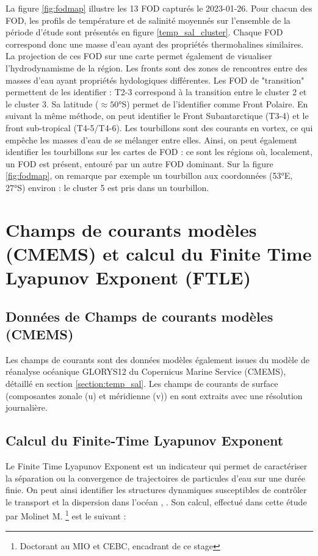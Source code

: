 	 	 La figure \ref{fig:fodmap} illustre les 13 FOD capturés le 2023-01-26. Pour chacun des FOD, les profils de température et de salinité moyennés sur l'ensemble de la période d'étude sont présentés en figure \ref{temp_sal_cluster}. Chaque FOD correspond donc une masse d'eau ayant des propriétés thermohalines similaires. La projection de ces FOD sur une carte permet également de visualiser l'hydrodynamisme de la région. Les fronts sont des zones de rencontres entre des masses d'eau ayant propriétés hydologiques différentes. Les FOD de "transition" permettent de les identifier : T2-3 correspond à la transition entre le cluster 2 et le cluster 3. Sa latitude ($\approx 50$°S) permet de l'identifier comme Front Polaire. En suivant la même méthode, on peut identifier le Front Subantarctique (T3-4) et le front sub-tropical (T4-5/T4-6). Les tourbillons sont des courants en vortex, ce qui empêche les masses d'eau de se mélanger entre elles. Ainsi, on peut également identifier les tourbillons sur les cartes de FOD : ce sont les régions où, localement, un FOD est présent, entouré par un autre FOD dominant. Sur la figure \ref{fig:fodmap}, on remarque par exemple un tourbillon aux coordonnées (53°E, 27°S) environ : le cluster 5 est pris dans un tourbillon.
 	
 \section{Champs de courants modèles (CMEMS) et calcul du Finite Time Lyapunov Exponent (FTLE)}
 \subsection{Données de Champs de courants modèles (CMEMS)}
 	Les champs de courants sont des données modèles également issues du modèle de réanalyse océanique GLORYS12 du Copernicus Marine Service (CMEMS), détaillé en section \ref{section:temp_sal}. Les champs de courants de surface (composantes zonale (u) et méridienne (v)) en sont extraits avec une résolution journalière.  
 	
 \subsection{Calcul du Finite-Time Lyapunov Exponent}
	 Le Finite Time Lyapunov Exponent est un indicateur qui permet de caractériser la séparation ou la convergence de trajectoires de particules d’eau sur une durée finie. On peut ainsi identifier les structures dynamiques susceptibles de contrôler le transport et la dispersion dans l’océan \cite{shadden2005definition}, \cite{dovidio2004mixing}. Son calcul, effectué dans cette étude par Molinet M. \footnote{Doctorant au MIO et CEBC, encadrant de ce stage} est le suivant :
	 
